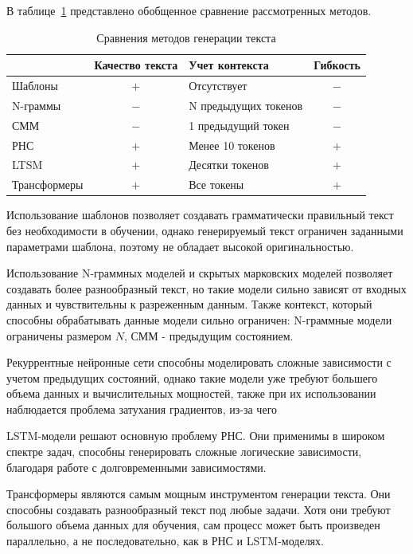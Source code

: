 В таблице~\ref{tbl:sravni} представлено обобщенное сравнение рассмотренных методов.

\begin{table}[h!]
    \begin{center}
        \caption{Сравнения методов генерации текста}
        \captionsetup{justification=raggedright, singlelinecheck=false}
        \label{tbl:sravni}
        \begin{tabular}{|p{3.2cm}|c|p{3.5cm}|c|}
            \hline
             & \textbf{Качество текста} & \textbf{Учет контекста} & \textbf{Гибкость} \\
            \hline
            Шаблоны & $+$ & Отсутствует & $-$ \\
            \hline
            N-граммы & $-$ & N предыдущих токенов & $-$ \\
            \hline
            СММ & $-$ & 1 предыдущий токен & $-$ \\
            \hline
            РНС & $+$ & Менее 10 токенов & $+$  \\
            \hline
            LTSM & $+$ & Десятки токенов & $+$ \\
            \hline
            Трансформеры & $+$ & Все токены & $+$ \\
            \hline
        \end{tabular}
    \end{center}
\end{table}

Использование шаблонов позволяет создавать грамматически правильный текст без необходимости в обучении, однако генерируемый текст ограничен заданными параметрами шаблона, поэтому не обладает высокой оригинальностью.

Использование N-граммных моделей и скрытых марковских моделей позволяет создавать более разнообразный текст, но такие модели сильно зависят от входных данных и чувствительны к разреженным данным. Также контекст, который способны обрабатывать данные модели сильно ограничен: N-граммные модели ограничены размером $N$, СММ - предыдущим состоянием.

Рекуррентные нейронные сети способны моделировать сложные зависимости с учетом предыдущих состояний, однако такие модели уже требуют большего объема данных и вычислительных мощностей, также при их использовании наблюдается проблема затухания градиентов, из-за чего 

LSTM-модели решают основную проблему РНС. Они применимы в широком спектре задач, способны генерировать сложные логические зависимости, благодаря работе с долговременными зависимостями.

Трансформеры являются самым мощным инструментом генерации текста. Они способны создавать разнообразный текст под любые задачи. Хотя они требуют большого объема данных для обучения, сам процесс может быть произведен параллельно, а не последовательно, как в РНС и LSTM-моделях.